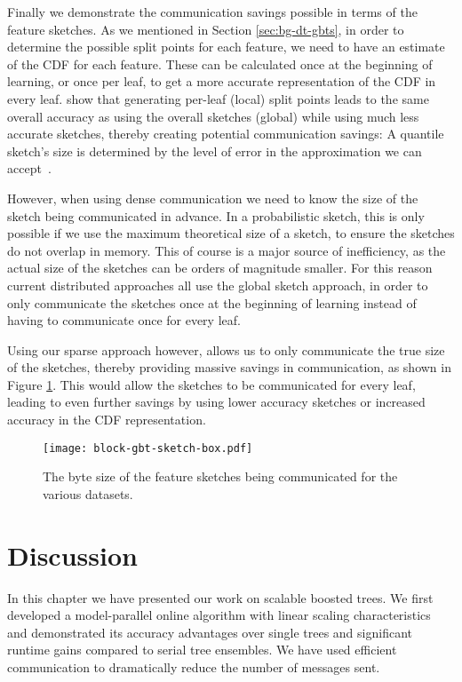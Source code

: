Finally we demonstrate the communication savings possible in terms of the feature sketches.
As we mentioned in Section \ref{sec:bg-dt-gbts}, in order to determine the possible
split points for each feature, we need to have an estimate of the CDF for each feature. These
can be calculated once at the beginning of learning, or once per leaf, to get a more accurate representation
of the CDF in every leaf. \citet{xgboost} show that generating per-leaf (local) split points leads to the same overall
accuracy as using the overall sketches (global) while using much less accurate sketches, thereby creating potential communication savings:
A quantile sketch's size is determined by the level of error in the approximation we can
accept~\cite{karnin2016kll}.

However, when using dense communication we need to know the size
of the sketch being communicated in advance. In a probabilistic sketch, this is only possible
if we use the maximum theoretical size of a sketch, to ensure the sketches do not overlap in memory.
This of course is a major source of inefficiency, as the actual size of the sketches can be orders
of magnitude smaller. For this reason
current distributed approaches all use the global sketch approach, in order to only communicate
the sketches once at the beginning of learning instead of having to communicate once for every
leaf.

Using our sparse approach however, allows us to only communicate the true size of the sketches,
thereby providing massive savings in communication, as shown in Figure \ref{fig:block-gbt-sketch-size}. This would allow the sketches to be communicated for every
leaf, leading to even further savings by using lower accuracy sketches or increased accuracy
in the CDF representation.

\begin{figure}
	\centering
	\texttt{[image: block-gbt-sketch-box.pdf]}
	\vspace{-10pt}
	\caption{The byte size of the feature sketches being communicated for the various datasets.}
	\label{fig:block-gbt-sketch-size}
\end{figure}

\section{Discussion}

In this chapter we have presented our work on scalable boosted
trees. We first developed a model-parallel online algorithm with linear scaling
characteristics and demonstrated its accuracy advantages over single
trees and significant runtime gains compared to serial tree ensembles.
We have used efficient communication to dramatically reduce the number
of messages sent.


